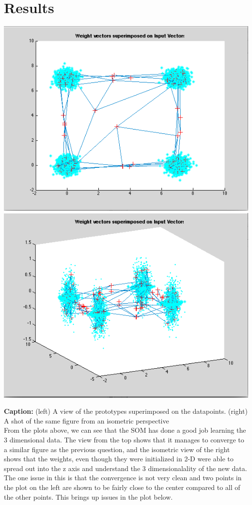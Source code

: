 \documentclass[epsfig]{article}
\begin{document}
\section*{Results}

\begin{center}
\includegraphics[scale=0.42]{pic3}
\includegraphics[scale=0.42]{pic4}
\end{center}
\textbf{Caption:} (left) A view of the prototypes superimposed on the datapoints. (right) A shot of the same figure from an isometric perspective\\
\newline
From the plots above, we can see that the SOM has done a good job learning the 3 dimensional data. The view from the top shows that it manages to converge to a similar figure as the previous question, and the isometric view of the right shows that the weights, even though they were initialized in 2-D were able to spread out into the z axis and understand the 3 dimensionalality of the new data. The one issue in this is that the convergence is not very clean and two points in the plot on the left are shown to be fairly close to the center compared to all of the other points. This brings up issues in the plot below.
\end{document}
